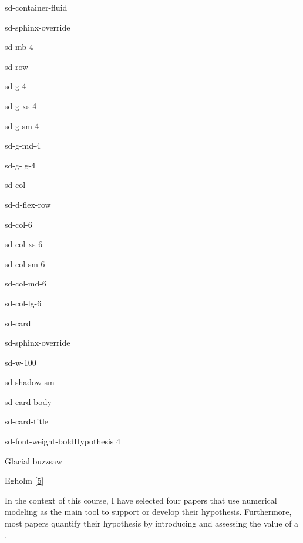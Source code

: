 \documentclass[letterpaper,10pt,english]{jupyterBook}
\let\sphinxpxdimen\pdfpxdimen\else\newdimen\sphinxpxdimen
\begin{document}
\begin{sphinxuseclass}{sd-container-fluid}
\begin{sphinxuseclass}{sd-sphinx-override}
\begin{sphinxuseclass}{sd-mb-4}
\begin{sphinxuseclass}{sd-row}
\begin{sphinxuseclass}{sd-g-4}
\begin{sphinxuseclass}{sd-g-xs-4}
\begin{sphinxuseclass}{sd-g-sm-4}
\begin{sphinxuseclass}{sd-g-md-4}
\begin{sphinxuseclass}{sd-g-lg-4}
\begin{sphinxuseclass}{sd-col}
\begin{sphinxuseclass}{sd-d-flex-row}
\begin{sphinxuseclass}{sd-col-6}
\begin{sphinxuseclass}{sd-col-xs-6}
\begin{sphinxuseclass}{sd-col-sm-6}
\begin{sphinxuseclass}{sd-col-md-6}
\begin{sphinxuseclass}{sd-col-lg-6}
\begin{sphinxuseclass}{sd-card}
\begin{sphinxuseclass}{sd-sphinx-override}
\begin{sphinxuseclass}{sd-w-100}
\begin{sphinxuseclass}{sd-shadow-sm}
\begin{sphinxuseclass}{sd-card-body}
\begin{sphinxuseclass}{sd-card-title}
\begin{sphinxuseclass}{sd-font-weight-bold}Hypothesis 4
\end{sphinxuseclass}
\end{sphinxuseclass}
\sphinxAtStartPar
Glacial buzzsaw

\noindent{\hspace*{\fill}\sphinxincludegraphics[width=200\sphinxpxdimen]{{egholmetal2009}.png}\hspace*{\fill}}

\sphinxAtStartPar
Egholm  {[}\hyperlink{cite.references:id8}{5}{]}

\end{sphinxuseclass}
\end{sphinxuseclass}
\end{sphinxuseclass}
\end{sphinxuseclass}
\end{sphinxuseclass}
\end{sphinxuseclass}
\end{sphinxuseclass}
\end{sphinxuseclass}
\end{sphinxuseclass}
\end{sphinxuseclass}
\end{sphinxuseclass}
\end{sphinxuseclass}
\end{sphinxuseclass}
\end{sphinxuseclass}
\end{sphinxuseclass}
\end{sphinxuseclass}
\end{sphinxuseclass}
\end{sphinxuseclass}
\end{sphinxuseclass}
\end{sphinxuseclass}
\end{sphinxuseclass}
\sphinxAtStartPar
In the context of this course, I have selected four papers that use numerical modeling as the main tool to support or develop their hypothesis. Furthermore, most papers quantify their hypothesis by introducing and assessing the value of a {\hyperref[\detokenize{glossary:term-Dimensionless-number}]{}}.
\end{document}
